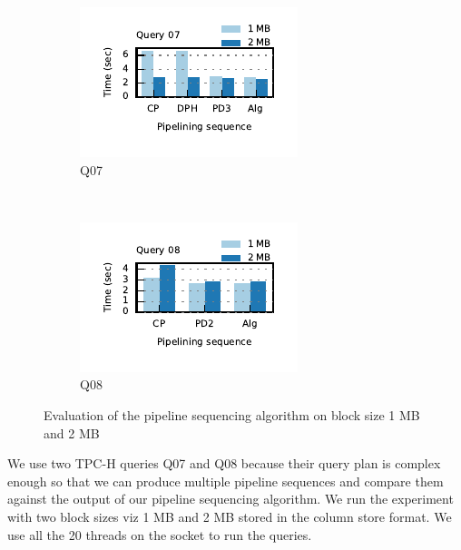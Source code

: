 \begin{figure}[t]
	\centering
	\begin{subfigure}[b]{0.45\textwidth}
		\includegraphics[width=\textwidth]{pipeline/figures/sequence-analysis-q07-bs1mb-bs2mb.pdf}
		\caption{Q07}
	\end{subfigure} %
	~
	\begin{subfigure}[b]{0.45\textwidth}
		\includegraphics[width=\textwidth]{pipeline/figures/sequence-analysis-q08-bs1mb-bs2mb.pdf}
	\caption{Q08}
	\end{subfigure}%
	\caption{Evaluation of the pipeline sequencing algorithm on block size 1 MB and 2 MB}
	\label{fig:pipeline-sequence-results}
\end{figure}

We use two TPC-H queries Q07 and Q08 because their query plan is complex enough so that we can produce multiple pipeline sequences and compare them against the output of our pipeline sequencing algorithm.
We run the experiment with two block sizes viz 1 MB and 2 MB stored in the column store format.
We use all the 20 threads on the socket to run the queries.

